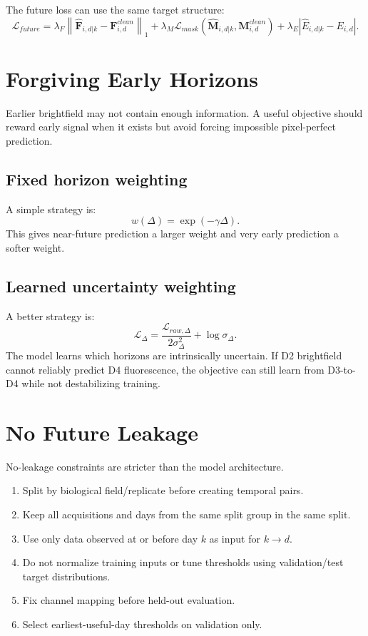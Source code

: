 \documentclass[11pt]{article}
\newcommand{\F}{\mathbf{F}}
\newcommand{\M}{\mathbf{M}}
\begin{document}
The future loss can use the same target structure:
\[
\mathcal{L}_{future}
=
\lambda_F \left\|\hat{\F}_{i,d|k}-\F^{clean}_{i,d}\right\|_1
+\lambda_M\mathcal{L}_{mask}(\hat{\M}_{i,d|k},\M^{clean}_{i,d})
+\lambda_E\left|\hat{E}_{i,d|k}-E_{i,d}\right|.
\]

\section{Forgiving Early Horizons}
Earlier brightfield may not contain enough information. A useful objective should reward early signal when it exists but avoid forcing impossible pixel-perfect prediction.

\subsection{Fixed horizon weighting}
A simple strategy is:
\[
w(\Delta)=\exp(-\gamma \Delta).
\]
This gives near-future prediction a larger weight and very early prediction a softer weight.

\subsection{Learned uncertainty weighting}
A better strategy is:
\[
\mathcal{L}_{\Delta}
=
\frac{\mathcal{L}_{raw,\Delta}}{2\sigma_\Delta^2}
+ \log \sigma_\Delta .
\]
The model learns which horizons are intrinsically uncertain. If D2 brightfield cannot reliably predict D4 fluorescence, the objective can still learn from D3-to-D4 while not destabilizing training.

\section{No Future Leakage}
No-leakage constraints are stricter than the model architecture.

\begin{enumerate}[leftmargin=1.5em]
  \item Split by biological field/replicate before creating temporal pairs.
  \item Keep all acquisitions and days from the same split group in the same split.
  \item Use only data observed at or before day \(k\) as input for \(k\to d\).
  \item Do not normalize training inputs or tune thresholds using validation/test target distributions.
  \item Fix channel mapping before held-out evaluation.
  \item Select earliest-useful-day thresholds on validation only.
\end{enumerate}
\end{document}
